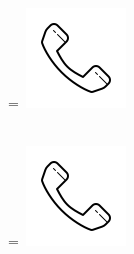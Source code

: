 \documentclass[]{latex/resume}
\begin{document}
\begin{minipage}[t]{0.25\textwidth}
    \begingroup
        =\hbox{
        \includegraphics[scale=0.1,trim={0 1.25cm -0.4cm 0cm}]{latex/icons/phone.png}\hspace{0.3cm}
        }
        \parbox{\wd0}{}
    \endgroup \\
    \begingroup
        =\hbox{
        \includegraphics[scale=0.1,trim={0 1.25cm -0.4cm 0cm}]{latex/icons/phone.png}\hspace{0.3cm}
        }
        \parbox{\wd0}{}
    \endgroup \\ 


\end{minipage} 
\end{document}
